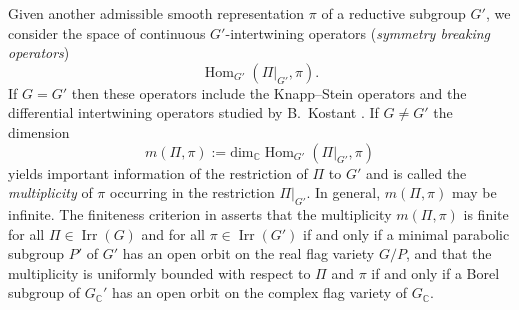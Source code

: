 Given another admissible smooth representation $\pi$
 of a reductive subgroup $G'$, 
 we consider the space of continuous $G'$-intertwining operators 
({\it{symmetry breaking operators}})
\[ \operatorname{Hom}_{G'} ({\Pi}|_{G'}, {\pi}) .\] 
If $G=G'$ then these operators include the Knapp--Stein operators \cite{KS}
 and the differential intertwining operators 
 studied by B.~Kostant \cite{Kos}.
If $G\not = G'$ the dimension 
\[
   m(\Pi,\pi) :=\mbox{dim}_{\mathbb{C}} \operatorname{Hom}_{G'} ({\Pi}|_{G'}, {\pi}) 
\]
 yields important information of the restriction of $\Pi $ to $G'$
 and is called the
 {\it{multiplicity}} of $\pi$
 occurring in the restriction $\Pi|_{G'}$.  
In general,
 $m(\Pi,\pi)$ may be infinite.  
The finiteness criterion in \cite{xKOfm} asserts that the
 multiplicity $m(\Pi,\pi)$ is finite
 for all $\Pi \in {\operatorname{Irr}}(G)$
 and for all $\pi \in {\operatorname{Irr}}(G')$
 if and only if a minimal parabolic subgroup $P'$
 of $G'$ has an open orbit 
 on the real flag variety $G/P$, 
 and that the multiplicity is uniformly bounded
 with respect to $\Pi$ and $\pi$
 if and only if a Borel subgroup of $G_{\mathbb{C}}'$
 has an open orbit
 on the complex flag variety of $G_{\mathbb{C}}$.  
 
